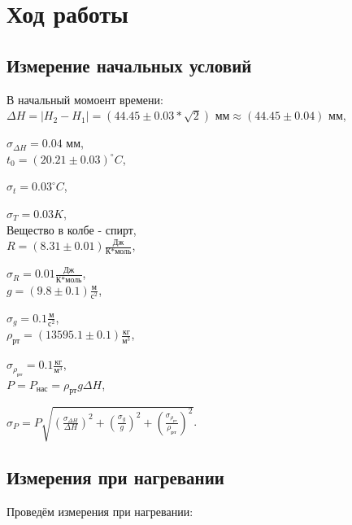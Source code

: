 \documentclass[a4paper]{article}
\begin{document}
\section{Ход работы}

\subsection{Измерение начальных условий}

В начальный момоент времени:\\

$\Delta H = |H_2 - H_1| = (44.45 \pm 0.03 * \sqrt{2})\text{ мм} \approx (44.45 \pm 0.04)\text{ мм}$,

$\sigma_{\Delta H} = 0.04\text{ мм}$, \\

$t_0 = (20.21 \pm 0.03)^\circ C$,

$\sigma_t = 0.03^\circ C$,

$\sigma_T = 0.03 K$, \\

Вещество в колбе - спирт,\\

$R = (8.31 \pm 0.01) \frac{\text{Дж}}{\text{К*моль}}$,

$\sigma_R = 0.01 \frac{\text{Дж}}{\text{К*моль}}$, \\

$g = (9.8 \pm 0.1) \frac{\text{м}}{\text{с}^2}$,

$\sigma_g = 0.1\frac{\text{м}}{\text{с}^2}$, \\

$\rho_\text{рт} = (13595.1 \pm 0.1) \frac{\text{кг}}{\text{м}^3}$,

$\sigma_{\rho_\text{рт}} = 0.1 \frac{\text{кг}}{\text{м}^3}$, \\

$P = P_\text{нас} = \rho_\text{рт}g \Delta H$,

$\sigma_P = P \sqrt{(\frac{\sigma_{\Delta H}}{\Delta H})^2 + (\frac{\sigma_g}{g})^2 + (\frac{\sigma_{\rho_\text{рт}}}{\rho_\text{рт}})^2}$. \\

\subsection{Измерения при нагревании}

Проведём измерения при нагревании:
\end{document}
